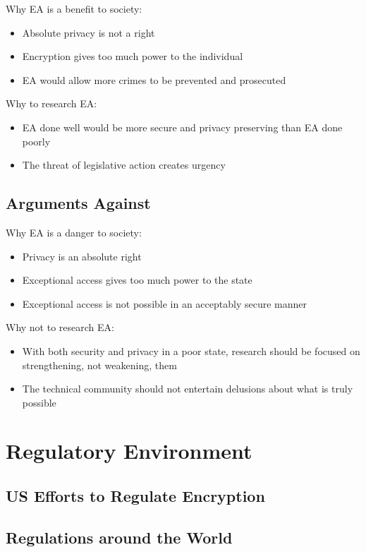 Why EA is a benefit to society:
\begin{itemize}
    \item Absolute privacy is not a right
    \item Encryption gives too much power to the individual
    \item EA would allow more crimes to be prevented and prosecuted
\end{itemize}

Why to research EA:
\begin{itemize}
    \item EA done well would be more secure and privacy preserving than EA done poorly
    \item The threat of legislative action creates urgency
\end{itemize}

\subsection{Arguments Against}

Why EA is a danger to society:
\begin{itemize}
    \item Privacy is an absolute right
    \item Exceptional access gives too much power to the state
    \item Exceptional access is not possible in an acceptably secure manner
\end{itemize}

Why not to research EA:
\begin{itemize}
    \item With both security and privacy in a poor state, research should be focused on strengthening, not weakening,
            them
    \item The technical community should not entertain delusions about what is truly possible
\end{itemize}

\section{Regulatory Environment}

\subsection{US Efforts to Regulate Encryption}

\subsection{Regulations around the World}

